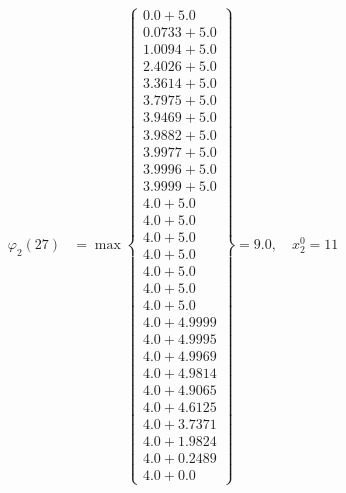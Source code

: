 \documentclass{article}
\begin{document}
\begin{align*}
  
\varphi_{2}(27) &= \max \left\{ \begin{array}{c}
0.0 + 5.0 \\
 0.0733 + 5.0 \\
 1.0094 + 5.0 \\
 2.4026 + 5.0 \\
 3.3614 + 5.0 \\
 3.7975 + 5.0 \\
 3.9469 + 5.0 \\
 3.9882 + 5.0 \\
 3.9977 + 5.0 \\
 3.9996 + 5.0 \\
 3.9999 + 5.0 \\
 4.0 + 5.0 \\
 4.0 + 5.0 \\
 4.0 + 5.0 \\
 4.0 + 5.0 \\
 4.0 + 5.0 \\
 4.0 + 5.0 \\
 4.0 + 5.0 \\
 4.0 + 4.9999 \\
 4.0 + 4.9995 \\
 4.0 + 4.9969 \\
 4.0 + 4.9814 \\
 4.0 + 4.9065 \\
 4.0 + 4.6125 \\
 4.0 + 3.7371 \\
 4.0 + 1.9824 \\
 4.0 + 0.2489 \\
 4.0 + 0.0
\end{array} \right\}=9.0,\quad x_{2}^0=11\\
  
  
  

\end{align*}
\end{document}
